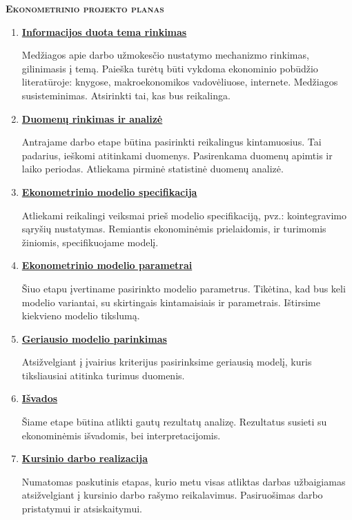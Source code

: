 \documentclass[12pt,a4paper]{article}
\theoremstyle{change}\newtheorem{salyga}{Uždavinys}
\begin{document}
\begin{center}
\textbf{\Large\textsc{Ekonometrinio projekto planas}}
\end{center}
\vskip 15pt
\begin{enumerate}



\item  \underline{\textbf{{Informacijos duota tema rinkimas}}}
\vskip 10pt

Medžiagos apie darbo užmokesčio nustatymo mechanizmo rinkimas, gilinimasis į temą. Paieška turėtų būti vykdoma ekonominio pobūdžio literatūroje: knygose, makroekonomikos vadovėliuose, internete. Medžiagos susisteminimas. Atsirinkti tai, kas bus reikalinga.

\item  \underline{\textbf{{Duomenų rinkimas ir analizė}}}
\vskip 10pt

Antrajame darbo etape būtina pasirinkti reikalingus kintamuosius. Tai padarius, ieškomi atitinkami duomenys. Pasirenkama duomenų apimtis ir laiko periodas. Atliekama pirminė statistinė duomenų analizė. 


\item  \underline{\textbf{{Ekonometrinio modelio specifikacija}}}
\vskip 10pt

Atliekami reikalingi veiksmai prieš modelio specifikaciją, pvz.: kointegravimo sąryšių nustatymas. Remiantis ekonominėmis prielaidomis, ir turimomis žiniomis, specifikuojame modelį. 

\item  \underline{\textbf{{Ekonometrinio modelio parametrai}}}
\vskip 10pt

Šiuo etapu įvertiname pasirinkto modelio parametrus. Tikėtina, kad bus  keli modelio variantai, su skirtingais kintamaisiais ir parametrais. Ištirsime kiekvieno modelio tikslumą. 

\item  \underline{\textbf{{Geriausio modelio parinkimas}}}
\vskip 10pt

Atsižvelgiant į įvairius kriterijus pasirinksime geriausią modelį, kuris tiksliausiai atitinka turimus duomenis. 

\item  \underline{\textbf{{Išvados}}}
\vskip 10pt

Šiame etape būtina atlikti gautų rezultatų analizę. Rezultatus susieti su ekonominėmis išvadomis, bei interpretacijomis.

\item  \underline{\textbf{{Kursinio darbo realizacija}}}
\vskip 10pt

Numatomas paskutinis etapas, kurio metu visas atliktas darbas užbaigiamas atsižvelgiant į kursinio darbo rašymo reikalavimus. Pasiruošimas darbo pristatymui ir atsiskaitymui.


\end{enumerate}



     
     
\end{document}
